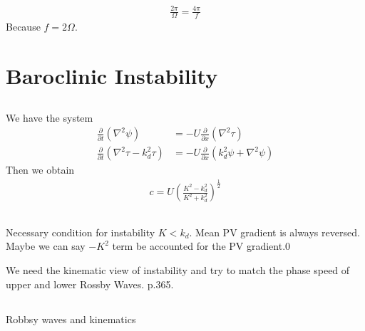 \documentclass[11pt,letterpaper]{book}
\theoremstyle{definition}
\newcommand{\pe}{\partial}
\begin{document}
\begin{align*}
\frac{2\pi}{\Omega} = \frac{4\pi}{f}
\end{align*}
Because $f = 2\Omega$.

\section{Baroclinic Instability}\label{prob:sep_2010_3}
\subsection{}

\subsection{}
We have the system
\begin{align}
\frac{\pe}{\pe t}\left(\nabla^2\psi\right) &= -U\frac{\pe}{\pe x}(\nabla^2\tau)\label{eq:sep_2010_1}\\
\frac{\pe}{\pe t}\left(\nabla^2\tau-k_d^2\tau\right) &= -U\frac{\pe}{\pe x}(k_d^2\psi+\nabla^2\psi)\label{eq:sep_2010_2}
\end{align}
Then we obtain
\begin{align*}
c = U\left( \frac{K^2-k_d^2}{K^2+k_d^2} \right)^{\frac{1}{2}}
\end{align*}

\subsection{}
Necessary condition for instability $K<k_d$. Mean PV gradient is always reversed. Maybe we can say $-K^2$ term be accounted for the PV gradient.0

We need the kinematic view of instability and try to match the phase speed of upper and lower Rossby Waves. \cite{vallis} p.365.

\subsection{}
Robbsy waves and kinematics
\end{document}
